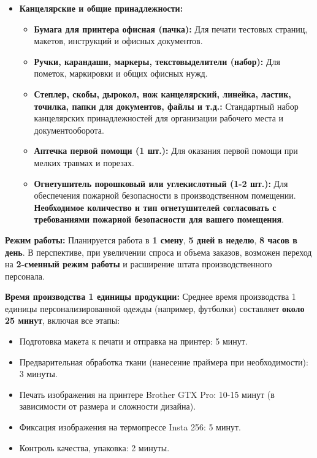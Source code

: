 \begin{itemize}
\begin{itemize}
\begin{itemize}
                \end{itemize}
            \item \textbf{Канцелярские и общие принадлежности:}
                \begin{itemize}
                    \item \textbf{Бумага для принтера офисная (пачка):}  Для печати тестовых страниц, макетов, инструкций и офисных документов.
                    \item \textbf{Ручки, карандаши, маркеры, текстовыделители (набор):}  Для пометок, маркировки и общих офисных нужд.
                    \item \textbf{Степлер, скобы, дырокол, нож канцелярский, линейка, ластик, точилка, папки для документов, файлы и т.д.:}  Стандартный набор канцелярских принадлежностей для организации рабочего места и документооборота.
                    \item \textbf{Аптечка первой помощи (1 шт.):}  Для оказания первой помощи при мелких травмах и порезах.
                    \item \textbf{Огнетушитель порошковый или углекислотный (1-2 шт.):}  Для обеспечения пожарной безопасности в производственном помещении.  \textbf{Необходимое количество и тип огнетушителей согласовать с требованиями пожарной безопасности для вашего помещения}.
                \end{itemize}
        \end{itemize}\end{itemize}

\vspace{0.3cm}

\textbf{Режим работы:}  Планируется работа в \textbf{1 смену}, \textbf{5 дней в неделю}, \textbf{8 часов в день}.  В перспективе, при увеличении спроса и объема заказов, возможен переход на \textbf{2-сменный режим работы} и расширение штата производственного персонала.

\vspace{0.3cm}

\textbf{Время производства 1 единицы продукции:}  Среднее время производства 1 единицы персонализированной одежды (например, футболки) составляет \textbf{около 25 минут}, включая все этапы:

\begin{itemize}[noitemsep]
    \item Подготовка макета к печати и отправка на принтер: 5 минут.
    \item Предварительная обработка ткани (нанесение праймера при необходимости): 3 минуты.
    \item Печать изображения на принтере Brother GTX Pro: 10-15 минут (в зависимости от размера и сложности дизайна).
    \item Фиксация изображения на термопрессе Insta 256: 5 минут.
    \item Контроль качества, упаковка: 2 минуты.
\end{itemize}

